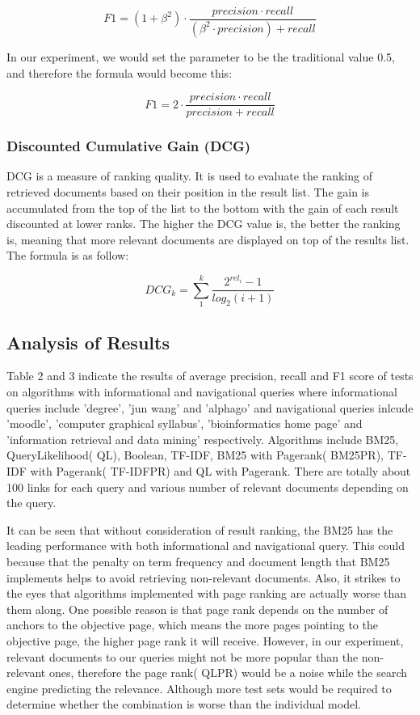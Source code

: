 \[F1=(1+\beta^{2})\cdot \frac{precision\cdot recall}{(\beta^{2}\cdot precision)+recall}\]

In our experiment, we would set the parameter to be the traditional value 0.5, and therefore the formula would become this:

\[F1=2\cdot \frac{precision \cdot recall}{precision+recall}\]

\subsubsection{Discounted Cumulative Gain (DCG)}

DCG is a measure of ranking quality. It is used to evaluate the ranking of retrieved documents based on their position in the result list. The gain is accumulated from the top of the list to the bottom with the gain of each result discounted at lower ranks. The higher the DCG value is, the better the ranking is, meaning that more relevant documents are displayed on top of the results list. The formula is as follow:

\[DCG_{k}=\sum_1^k \frac{2^{rel_{i}}-1}{log_{2}(i+1)}\]


\subsection{Analysis of Results} %
\label{sub:analysis_of_results}
Table 2 and 3 indicate the results of average precision, recall and F1 score of tests on algorithms with informational and navigational queries where informational queries include 'degree', 'jun wang' and 'alphago' and navigational queries inlcude 'moodle', 'computer graphical syllabus', 'bioinformatics home page' and 'information retrieval and data mining'  respectively. Algorithms include BM25, QueryLikelihood( QL), Boolean, TF-IDF, BM25 with Pagerank( BM25PR), TF-IDF with Pagerank( TF-IDFPR) and QL with Pagerank. There are totally about 100 links for each query and various number of relevant documents depending on the query.

It can be seen that without consideration of result ranking, the BM25 has the leading performance with both informational and navigational query. This could because that the penalty on term frequency and document length that BM25 implements helps to avoid retrieving non-relevant documents. Also, it strikes to the eyes that algorithms implemented with page ranking are actually worse than them along. One possible reason is that page rank depends on the number of anchors to the objective page, which means the more pages pointing to the objective page, the higher page rank it will receive. However, in our experiment, relevant documents to our queries might not be more popular than the non-relevant ones, therefore the page rank( QLPR) would be a noise while the search engine predicting the relevance. Although more test sets would be required to determine whether the combination is worse than the individual model.

